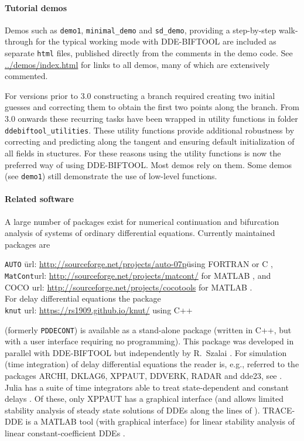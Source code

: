 \documentclass[10pt]{scrartcl}
\newcommand{\DDEBIFCODE}{\textsc{DDE-BIFTOOL}}
\newcommand{\ddebifweb}{\url{https://sourceforge.net/projects/ddebiftool}}
\newcommand{\demobase}{\url{../demos/index.html}}
\begin{document}
\paragraph{Tutorial demos}
Demos such as \texttt{demo1}, \texttt{minimal\_demo} and
\texttt{sd\_demo}, providing a step-by-step walk-through for the
typical working mode with \DDEBIFCODE{} are included as separate
\texttt{html} files, published directly from the comments in the demo
code. See \demobase{} for links to all demos, many of which are
extensively commented.

For versions prior to 3.0 constructing a branch required creating two
initial guesses and correcting them to obtain the first two points
along the branch. From 3.0 onwards these recurring tasks have been
wrapped in utility functions in folder
\texttt{ddebiftool\_utilities}. These utility functions provide
additional robustness by correcting and predicting along the tangent
and ensuring default initialization of all fields in stuctures. For
these reasons using the utility functions is now the preferred way of
using \DDEBIFCODE{}. Most demos rely on them. Some demos (see
\texttt{demo1}) still demonstrate the use of low-level functions.


\paragraph{Related software}
A large number of packages exist for numerical continuation and
bifurcation analysis of systems of ordinary differential
equations. Currently maintained packages are
\begin{tabbing}
  \texttt{AUTO}\qquad
  \= url: \url{http://sourceforge.net/projects/auto-07p}\qquad\=
  using FORTRAN or C \cite{Doed99,Doed07},\\
  \texttt{MatCont}\>url: \url{http://sourceforge.net/projects/matcont/}\>
  for MATLAB \cite{DGK03,G00}, and\\
  \textsc{COCO}\> url: \url{http://sourceforge.net/projects/cocotools}\> for
  MATLAB \cite{DS13}.\\[1ex]
  For delay differential equations the package\\[0.5ex]
  \texttt{knut}\> url: \url{https://rs1909.github.io/knut/}\> using C++
\end{tabbing}
(formerly \texttt{PDDECONT}) is available as a stand-alone package
(written in C++, but with a user interface requiring no
programming). This package was developed in parallel with
\DDEBIFCODE{} but independently by R.~Szalai \cite{SSH06,RS07}.  For
simulation (time integration) of delay differential equations the
reader is, e.g., referred to the packages ARCHI, DKLAG6, XPPAUT,
DDVERK, RADAR and dde23, see
\cite{Paul95,Thom97,Erme98,Enri97,Sham00,Gugl07}. Julia has a suite of
time integrators able to treat state-dependent and constant delays
\cite{RN17Julia}. Of these, only XPPAUT has a graphical interface (and
allows limited stability analysis of steady state solutions of DDEs
along the lines of \cite{Luzy96}). TRACE-DDE is a MATLAB tool (with
graphical interface) for linear stability analysis of linear
constant-coefficient DDEs
\cite{breda09}.%
\end{document}
